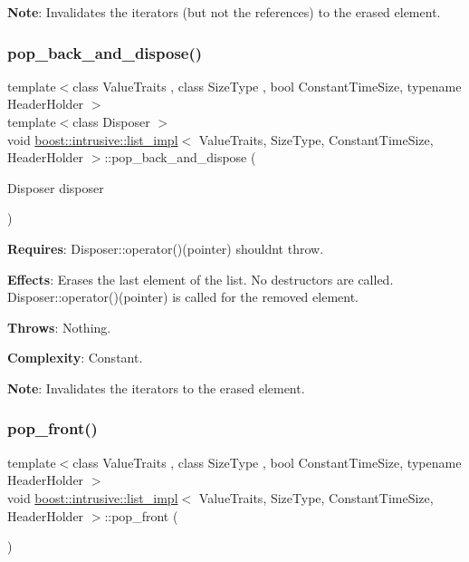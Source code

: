 {\bfseries Note}\+: Invalidates the iterators (but not the references) to the erased element. \mbox{\label{classboost_1_1intrusive_1_1list__impl_ad2f45b6fd9f4d189e9f5c6fc126334b8}} 
\subsubsection{\texorpdfstring{pop\+\_\+back\+\_\+and\+\_\+dispose()}{pop\_back\_and\_dispose()}}
{\footnotesize\ttfamily template$<$class Value\+Traits , class Size\+Type , bool Constant\+Time\+Size, typename Header\+Holder $>$ \\
template$<$class Disposer $>$ \\
void \hyperlink{classboost_1_1intrusive_1_1list__impl}{boost\+::intrusive\+::list\+\_\+impl}$<$ Value\+Traits, Size\+Type, Constant\+Time\+Size, Header\+Holder $>$\+::pop\+\_\+back\+\_\+and\+\_\+dispose (\begin{DoxyParamCaption}\item[{Disposer}]{disposer }\end{DoxyParamCaption})\hspace{0.3cm}{\ttfamily [inline]}}

{\bfseries Requires}\+: Disposer\+::operator()(pointer) shouldn\textquotesingle{}t throw.

{\bfseries Effects}\+: Erases the last element of the list. No destructors are called. Disposer\+::operator()(pointer) is called for the removed element.

{\bfseries Throws}\+: Nothing.

{\bfseries Complexity}\+: Constant.

{\bfseries Note}\+: Invalidates the iterators to the erased element. \mbox{\label{classboost_1_1intrusive_1_1list__impl_aa0a3b2545ff925b8f3185ab5f4027d4e}} 
\subsubsection{\texorpdfstring{pop\+\_\+front()}{pop\_front()}}
{\footnotesize\ttfamily template$<$class Value\+Traits , class Size\+Type , bool Constant\+Time\+Size, typename Header\+Holder $>$ \\
void \hyperlink{classboost_1_1intrusive_1_1list__impl}{boost\+::intrusive\+::list\+\_\+impl}$<$ Value\+Traits, Size\+Type, Constant\+Time\+Size, Header\+Holder $>$\+::pop\+\_\+front (\begin{DoxyParamCaption}{ }\end{DoxyParamCaption})\hspace{0.3cm}{\ttfamily [inline]}}

